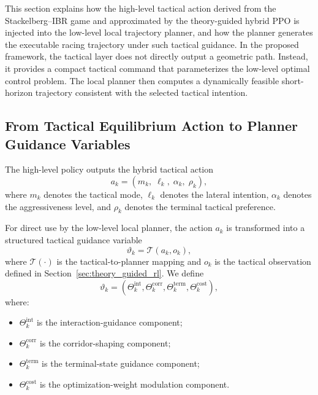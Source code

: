 \documentclass[final ,3p, times]{elsarticle}
\begin{document}
This section explains how the high-level tactical action derived from the Stackelberg--IBR game and approximated by the theory-guided hybrid PPO is injected into the low-level local trajectory planner, and how the planner generates the executable racing trajectory under such tactical guidance. In the proposed framework, the tactical layer does not directly output a geometric path. Instead, it provides a compact tactical command that parameterizes the low-level optimal control problem. The local planner then computes a dynamically feasible short-horizon trajectory consistent with the selected tactical intention.

\subsection{From Tactical Equilibrium Action to Planner Guidance Variables}
\label{subsec:tactical_guidance_variables}

The high-level policy outputs the hybrid tactical action
\begin{equation}
a_k =
\left(
m_k,\;
\ell_k,\;
\alpha_k,\;
\rho_k
\right),
\label{eq:high_level_tactical_action_again}
\end{equation}
where $m_k$ denotes the tactical mode, $\ell_k$ denotes the lateral intention, $\alpha_k$ denotes the aggressiveness level, and $\rho_k$ denotes the terminal tactical preference.

For direct use by the low-level local planner, the action $a_k$ is transformed into a structured tactical guidance variable
\begin{equation}
\vartheta_k = \mathcal{T}(a_k,o_k),
\label{eq:tactical_guidance_mapping}
\end{equation}
where $\mathcal{T}(\cdot)$ is the tactical-to-planner mapping and $o_k$ is the tactical observation defined in Section~\ref{sec:theory_guided_rl}. We define
\begin{equation}
\vartheta_k
=
\left(
\Theta_k^{\mathrm{int}},
\Theta_k^{\mathrm{corr}},
\Theta_k^{\mathrm{term}},
\Theta_k^{\mathrm{cost}}
\right),
\label{eq:tactical_guidance_decomposition}
\end{equation}
where:
\begin{itemize}
    \item $\Theta_k^{\mathrm{int}}$ is the interaction-guidance component;
    \item $\Theta_k^{\mathrm{corr}}$ is the corridor-shaping component;
    \item $\Theta_k^{\mathrm{term}}$ is the terminal-state guidance component;
    \item $\Theta_k^{\mathrm{cost}}$ is the optimization-weight modulation component.
\end{itemize}
\end{document}
